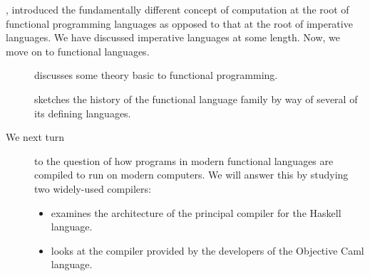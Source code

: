 \label{functional:overview}
, introduced the fundamentally different concept of computation at the root of functional programming languages as opposed to that at the root of imperative languages. We have discussed imperative languages at some length. Now, we move on to functional languages.

\begin{description}
\item[] discusses some theory basic to functional programming.
\item[] sketches the history of the functional language family by way of several of its defining languages.
\item[We next turn] to the question of how programs in modern functional languages are compiled to run on modern computers. We will answer this by studying two widely-used compilers:
\begin{itemize}
\item {} examines the architecture of the principal compiler for the Haskell language.
\item {} looks at the compiler provided by the developers of the Objective Caml language.
\end{itemize}
\end{description}